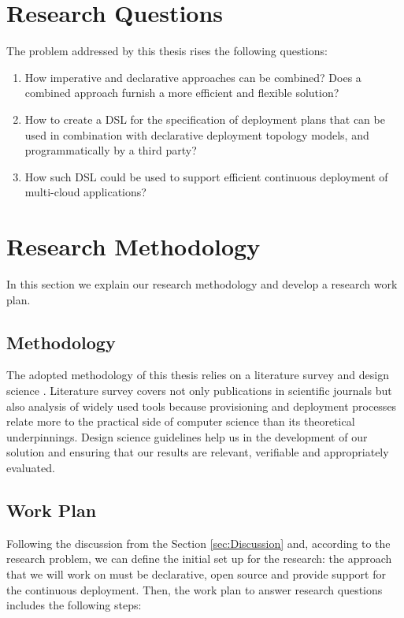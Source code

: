 \section{Research Questions} 

\noindent The problem addressed by this thesis rises the following questions:

\begin{enumerate}
\item  How imperative and declarative approaches can be combined? Does a combined approach furnish a more efficient and flexible solution?

\item  How to create a DSL for the specification of deployment plans that can be used in combination with declarative deployment topology models, and programmatically by a third party?

\item  How such DSL could be used to support efficient continuous deployment of multi-cloud applications?

\end{enumerate}


\section{Research Methodology}
In this section we explain our research methodology and develop a research work plan.

\subsection{Methodology}

\noindent The adopted methodology of this thesis relies on a literature survey and design science \cite{von2004design}. Literature survey covers not only publications in scientific journals but also analysis of widely used tools because provisioning and deployment processes relate more to the practical side of computer science than its theoretical underpinnings. Design science guidelines help us in the development of our solution and ensuring that our results are relevant, verifiable and appropriately evaluated.

\subsection{Work Plan}
Following the discussion from the Section \ref{sec:Discussion} and, according to the research problem, we can define the initial set up for the research: the approach that we will work on must be declarative, open source and provide support for the continuous deployment. Then, the work plan to answer research questions includes the following steps:

